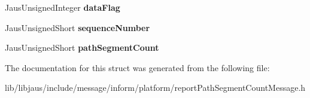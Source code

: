 \begin{DoxyCompactItemize}
\item 
\hypertarget{struct_report_path_segment_count_message_struct_ad21c4fdfb9c0ab68a2edf4a182b4fa04}{\-Jaus\-Unsigned\-Integer {\bfseries data\-Flag}}\label{struct_report_path_segment_count_message_struct_ad21c4fdfb9c0ab68a2edf4a182b4fa04}

\item 
\hypertarget{struct_report_path_segment_count_message_struct_a92b49ad62d9f786559e17e811459f811}{\-Jaus\-Unsigned\-Short {\bfseries sequence\-Number}}\label{struct_report_path_segment_count_message_struct_a92b49ad62d9f786559e17e811459f811}

\item 
\hypertarget{struct_report_path_segment_count_message_struct_a3a472dbf9ac885e0583438515e42ce14}{\-Jaus\-Unsigned\-Short {\bfseries path\-Segment\-Count}}\label{struct_report_path_segment_count_message_struct_a3a472dbf9ac885e0583438515e42ce14}

\end{DoxyCompactItemize}


\-The documentation for this struct was generated from the following file\-:\begin{DoxyCompactItemize}
\item 
lib/libjaus/include/message/inform/platform/report\-Path\-Segment\-Count\-Message.\-h\end{DoxyCompactItemize}
